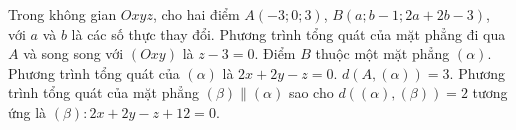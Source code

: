 \begin{ex}
Trong không gian $Oxyz$, cho hai điểm $A(-3;0;3)$, $B(a;b-1;2a+2b-3)$, với $a$ và $b$ là các số thực thay đổi.
\choiceTF
{\True Phương trình tổng quát của mặt phẳng đi qua $A$ và song song với $(Oxy)$ là $z-3=0$.}
{Điểm $B$ thuộc một mặt phẳng $(\alpha)$. Phương trình tổng quát của $(\alpha)$ là $2x+2y-z=0$.}
{$d\left(A,(\alpha)\right)=3$.}
{Phương trình tổng quát của mặt phẳng $(\beta)\parallel(\alpha)$ sao cho $d\left((\alpha),(\beta)\right)=2$ tương ứng là $(\beta)\colon 2x+2y-z+12=0$.}
\end{ex}
